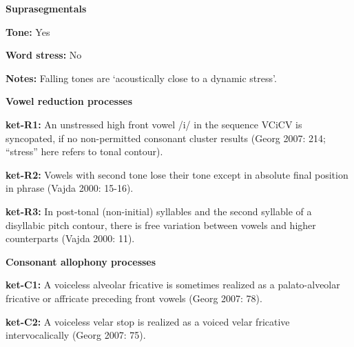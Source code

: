 \begin{styleBody}
\textbf{Suprasegmentals}
\end{styleBody}

\begin{styleBody}
\textbf{Tone:} Yes
\end{styleBody}

\begin{styleBody}
\textbf{Word stress:} No
\end{styleBody}

\begin{styleBody}
\textbf{Notes: }Falling tones are ‘acoustically close to a dynamic stress’.
\end{styleBody}

\begin{styleBody}
\textbf{Vowel reduction processes}
\end{styleBody}

\begin{styleBody}
\textbf{ket-R1:} An unstressed high front vowel /i/ in the sequence VCiCV is syncopated, if no non-permitted consonant cluster results (Georg 2007: 214; “stress” here refers to tonal contour).
\end{styleBody}

\begin{styleBody}
\textbf{ket-R2:} Vowels with second tone lose their tone except in absolute final position in phrase (Vajda 2000: 15-16).
\end{styleBody}

\begin{styleBody}
\textbf{ket-R3:} In post-tonal (non-initial) syllables and the second syllable of a disyllabic pitch contour, there is free variation between vowels and higher counterparts (Vajda 2000: 11).
\end{styleBody}

\begin{styleBody}
\textbf{Consonant allophony processes}
\end{styleBody}

\begin{styleBody}
\textbf{ket-C1: }A voiceless alveolar fricative is sometimes realized as a palato-alveolar fricative or affricate preceding front vowels (Georg 2007: 78).
\end{styleBody}

\begin{styleBody}
\textbf{ket-C2: }A voiceless velar stop is realized as a voiced velar fricative intervocalically (Georg 2007: 75).
\end{styleBody}

